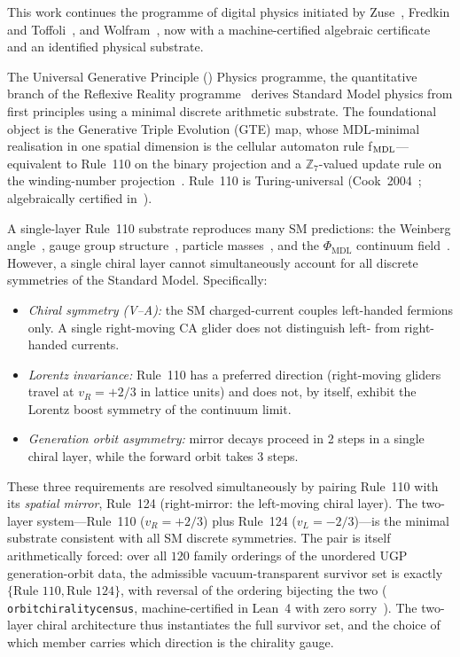 \documentclass[11pt]{article}
\theoremstyle{remark}
\newcommand{\UGP}{\text{UGP}}
\newcommand{\PHIMDL}{\Phi_{\mathrm{MDL}}}
\newcommand{\ZS}{\mathbb{Z}_7}
\newcommand{\lean}[1]{%
  \penalty-100
  \begingroup\def\_{\textunderscore\allowbreak}\texttt{#1}\endgroup}
\begin{document}
This work continues the programme of digital physics initiated by
Zuse~\cite{Zuse1969}, Fredkin and Toffoli~\cite{fredkin1982conservative}, and
Wolfram~\cite{Wolfram2002}, now with a machine-certified algebraic certificate
and an identified physical substrate.

The Universal Generative Principle (\UGP{}) Physics programme, the quantitative branch of the Reflexive Reality programme~\cite{SpivackCompUniversality,SpivackResearchProgrammes}
derives Standard Model physics from first principles using a minimal discrete
arithmetic substrate.  The foundational object is the Generative Triple
Evolution (GTE) map, whose MDL-minimal realisation in one spatial dimension
is the cellular automaton rule f$_{\rm MDL}$---equivalent to Rule~110 on the
binary projection and a $\ZS$-valued update rule on the winding-number
projection~\cite{SpivackGTEMobius}.  Rule~110 is Turing-universal
(Cook~2004~\cite{Cook2004}; algebraically certified in~\cite{SpivackGF7Universality}).

A single-layer Rule~110 substrate reproduces many SM predictions:
the Weinberg angle~\cite{SpivackWeinbergAngle}, gauge group
structure~\cite{SpivackGTEUnification}, particle
masses~\cite{SpivackQMFromR110}, and the $\PHIMDL$ continuum
field~\cite{SpivackGTEMobius}.  However, a single chiral layer cannot
simultaneously account for all discrete symmetries of the Standard Model.
Specifically:
\begin{itemize}[noitemsep]
  \item \textit{Chiral symmetry (V--A):} the SM charged-current couples
    left-handed fermions only.  A single right-moving CA glider does not
    distinguish left- from right-handed currents.
  \item \textit{Lorentz invariance:} Rule~110 has a preferred direction
    (right-moving gliders travel at $v_R=+2/3$ in lattice units) and does
    not, by itself, exhibit the Lorentz boost symmetry of the continuum
    limit.
  \item \textit{Generation orbit asymmetry:} mirror decays proceed in 2 steps
    in a single chiral layer, while the forward orbit takes 3 steps.
\end{itemize}

These three requirements are resolved simultaneously by pairing Rule~110
with its \emph{spatial mirror}, Rule~124 (right-mirror: the left-moving
chiral layer).  The two-layer system---Rule~110 ($v_R=+2/3$) plus
Rule~124 ($v_L=-2/3$)---is the minimal substrate consistent with all SM
discrete symmetries.
The pair is itself arithmetically forced: over all $120$ family orderings
of the unordered UGP generation-orbit data, the admissible vacuum-transparent
survivor set is exactly $\{\text{Rule~110}, \text{Rule~124}\}$, with reversal
of the ordering bijecting the two (\lean{orbit\_chirality\_census},
machine-certified in Lean~4 with zero
sorry~\cite{SpivackGTEPolynomialWolfram,SpivackGTECompleteFramework}).
The two-layer chiral architecture thus instantiates the full survivor set,
and the choice of which member carries which direction is the chirality
gauge.
\end{document}
